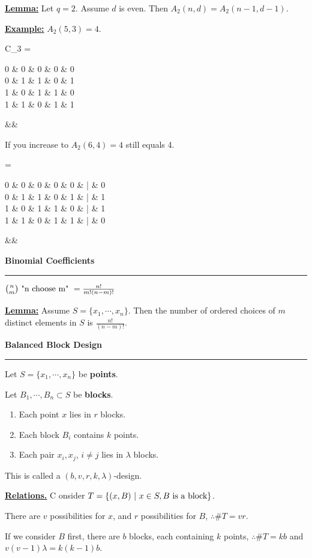 \documentclass{article}
\newcommand{\header}[1]{
	\begin{Large}
	\noindent\textbf{#1}
	\vspace{2pt}
	\hrule
	\vspace{16pt}
	\end{Large}
	\normalsize
}
\newcommand{\h}[2]{
	\noindent\textbf{\underline{#1.}}
	#2
}
\renewcommand{\b}[1]{\textbf{#1}}
\newcommand{\ul}[1]{\underline{#1}}
\newcommand{\laligned}[1]{
	\begin{flalign*}
		#1 &&
	\end{flalign*}
}
\newcommand{\newdef}[2]{\b{\ul{#1:}} #2}
\begin{document}
\newdef{Lemma}{
	Let $q = 2$. Assume $d$ is even. Then $A_2(n, d) = A_2(n-1, d-1)$.
}

\newdef{Example}{
	$A_2(5, 3) = 4$.
	\laligned{
		C_3 = \begin{bmatrix}
			0 & 0 & 0 & 0 & 0 \\
			0 & 1 & 1 & 0 & 1 \\
			1 & 0 & 1 & 1 & 0 \\
			1 & 1 & 0 & 1 & 1 \\
		\end{bmatrix}
	}
	If you increase to $A_2(6, 4) = 4$ still equals 4.
	\laligned{
		\tilde{C_3} = \begin{bmatrix}
			0 & 0 & 0 & 0 & 0 & | & 0 \\
			0 & 1 & 1 & 0 & 1 & | & 1 \\
			1 & 0 & 1 & 1 & 0 & | & 1 \\
			1 & 1 & 0 & 1 & 1 & | & 0 \\
		\end{bmatrix}
	}
}

\header{Binomial Coefficients}

$\binom{n}{m} \textnormal{ "n choose m" } = \frac{n!}{m!(n-m)!}$

\newdef{Lemma}{
	Assume $S = \{x_1, \cdots, x_n\}$. Then the number of ordered choices
	of $m$ distinct elements in $S$ is $\frac{n!}{(n-m)!}$.
}

\header{Balanced Block Design}

Let $S = \{x_1, \cdots, x_n\}$ be \b{points}.

Let $B_1, \cdots, B_n \subset S$ be \b{blocks}.

\begin{enumerate}
	\item Each point $x$ lies in $r$ blocks.
	\item Each block $B_i$ contains $k$ points.
	\item Each pair $x_i, x_j$, $i \neq j$ lies in $\lambda$ blocks.
\end{enumerate}

This is called a $(b, v, r, k, \lambda)$-design.

\h{Relations}

Consider $T = \{(x, B)\ |\ x \in S, B \textnormal{ is a block}\}$.

There are $v$ possibilities for $x$, and $r$ possibilities for $B$,
$\therefore \#T = vr$.

If we consider $B$ first, there are $b$ blocks, each containing $k$ points,
$\therefore \#T = kb$ and \newline $v(v-1)\lambda = k(k-1)b$.
\end{document}
